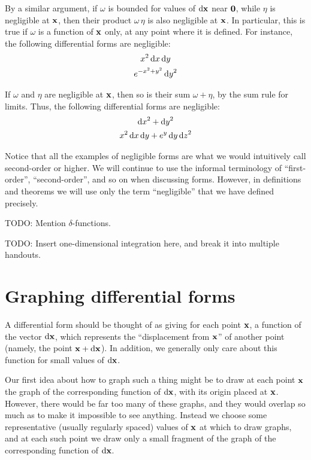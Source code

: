 \begin{eg}
  By a similar argument, if $\omega$ is bounded for values of ${\mathrm{d} \mathbf{x}}$ near $\mathbf{0}$, while $\eta$ is negligible at $\mathbf{x}$, then their product $\omega\,\eta$ is also negligible at $\mathbf{x}$.
  In particular, this is true if $\omega$ is a function of $\mathbf{x}$ only, at any point where it is defined.
  For instance, the following differential forms are negligible:
  \begin{gather*}
    x^2\,{\mathrm{d} x}\,{\mathrm{d} y}\\
    e^{-x^2+y^2} \,{\mathrm{d} y}^2
  \end{gather*}
\end{eg}

\begin{eg}
  If $\omega$ and $\eta$ are negligible at $\mathbf{x}$, then so is their sum $\omega+\eta$, by the sum rule for limits.
  Thus, the following differential forms are negligible:
  \begin{gather*}
    {\ensuremath{\mathrm{d} x}}^2 + {\mathrm{d} y}^2\\
    x^2 \,{\mathrm{d} x}\,{\mathrm{d} y} + e^{y}\,{\mathrm{d} y}\,{\mathrm{d} z}^2
  \end{gather*}
\end{eg}

Notice that all the examples of negligible forms are what we would intuitively call second-order or higher.
We will continue to use the informal terminology of ``first-order'', ``second-order'', and so on when discussing forms.
However, in definitions and theorems we will use only the term ``negligible'' that we have defined precisely.

TODO: Mention $\delta$-functions.

TODO: Insert one-dimensional integration here, and break it into multiple handouts.

\section{Graphing differential forms}
\label{sec:graphing-differential-forms}

A differential form should be thought of as giving for each point $\mathbf{x}$, a function of the vector ${\mathrm{d} \mathbf{x}}$, which represents the ``displacement from $\mathbf{x}$'' of another point (namely, the point $\mathbf{x}+{\mathrm{d} \mathbf{x}}$).
In addition, we generally only care about this function for small values of ${\mathrm{d} \mathbf{x}}$.

Our first idea about how to graph such a thing might be to draw at each point $\mathbf{x}$ the graph of the corresponding function of ${\mathrm{d} \mathbf{x}}$, with its origin placed at $\mathbf{x}$.
However, there would be far too many of these graphs, and they would overlap so much as to make it impossible to see anything.
Instead we choose some representative (usually regularly spaced) values of $\mathbf{x}$ at which to draw graphs, and at each such point we draw only a small fragment of the graph of the corresponding function of ${\mathrm{d} \mathbf{x}}$.

